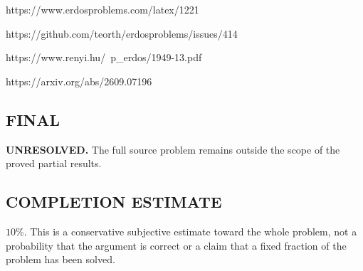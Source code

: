 https://www.erdosproblems.com/latex/1221

https://github.com/teorth/erdosproblems/issues/414

https://www.renyi.hu/~p_erdos/1949-13.pdf

https://arxiv.org/abs/2609.07196

\subsection*{FINAL}
\textbf{UNRESOLVED.} The full source problem remains outside the scope of the proved partial results.

\subsection*{COMPLETION ESTIMATE}
$10\%$. This is a conservative subjective estimate toward the whole problem, not a probability that the argument is correct or a claim that a fixed fraction of the problem has been solved.
